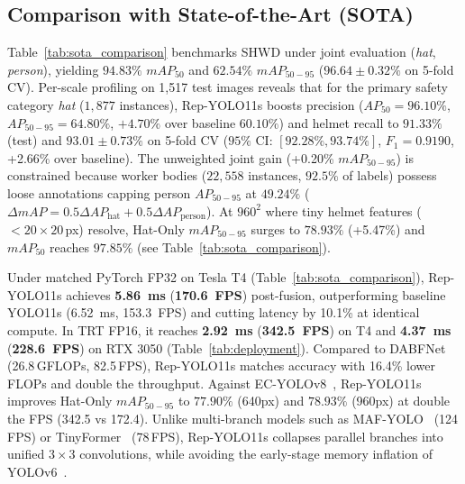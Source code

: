 \documentclass[conference]{IEEEtran}
\begin{document}
\subsection{Comparison with State-of-the-Art (SOTA)}
\label{subsec:sota}
Table~\ref{tab:sota_comparison} benchmarks SHWD under joint evaluation (\textit{hat}, \textit{person}), yielding $94.83\%$ $mAP_{50}$ and $62.54\%$ $mAP_{50-95}$ ($96.64 \pm 0.32\%$ on 5-fold CV). Per-scale profiling on 1,517 test images reveals that for the primary safety category \textit{hat} ($1,877$ instances), Rep-YOLO11s boosts precision ($AP_{50}=96.10\%$, $AP_{50-95}=64.80\%$, $+4.70\%$ over baseline $60.10\%$) and helmet recall to $91.33\%$ (test) and $\mathbf{93.01 \pm 0.73\%}$ on 5-fold CV ($95\%$ CI: $[92.28\%, 93.74\%]$, $F_1=0.9190$, +2.66\% over baseline). The unweighted joint gain (+0.20\% $mAP_{50-95}$) is constrained because worker bodies ($22,558$ instances, $92.5\%$ of labels) possess loose annotations capping person $AP_{50-95}$ at $49.24\%$ ($\Delta mAP = 0.5\Delta AP_{\text{hat}} + 0.5\Delta AP_{\text{person}}$). At $960^2$ where tiny helmet features \mbox{($<20\times20$\,px)} resolve, Hat-Only $mAP_{50-95}$ surges to $\mathbf{78.93\%}$ (+5.47\%) and $mAP_{50}$ reaches $\mathbf{97.85\%}$ (see Table~\ref{tab:sota_comparison}).

Under matched PyTorch FP32 on Tesla T4 (Table~\ref{tab:sota_comparison}), Rep-YOLO11s achieves \textbf{5.86~ms} (\textbf{170.6~FPS}) post-fusion, outperforming baseline YOLO11s (6.52~ms, 153.3~FPS) and cutting latency by 10.1\% at identical compute. In TRT FP16, it reaches \textbf{2.92~ms} (\textbf{342.5~FPS}) on T4 and \textbf{4.37~ms} (\textbf{228.6~FPS}) on RTX 3050 (Table~\ref{tab:deployment}). Compared to DABFNet~\cite{dabfnet2024} (26.8\,GFLOPs, 82.5\,FPS), Rep-YOLO11s matches accuracy with 16.4\% lower FLOPs and double the throughput. Against EC-YOLOv8~\cite{ecyolov8_2024}, Rep-YOLO11s improves Hat-Only $mAP_{50-95}$ to $\mathbf{77.90\%}$ (640px) and $\mathbf{78.93\%}$ (960px) at double the FPS (342.5 vs 172.4). Unlike multi-branch models such as MAF-YOLO~\cite{mafyolo2024} (124\,FPS) or TinyFormer~\cite{tinyformer2024} (78\,FPS), Rep-YOLO11s collapses parallel branches into unified $3\times3$ convolutions, while avoiding the early-stage memory inflation of YOLOv6~\cite{li2023yolov6}.
\end{document}
